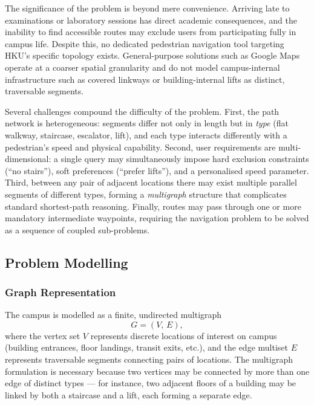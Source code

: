 \documentclass[a4paper,10pt]{amsart}
\begin{document}
The significance of the problem is beyond mere convenience.
Arriving late to examinations or laboratory sessions has direct academic consequences, and the inability to find accessible routes may exclude users from participating fully in campus life.
Despite this, no dedicated pedestrian navigation tool targeting HKU's specific topology exists.
General-purpose solutions such as Google Maps operate at a coarser spatial granularity and do not model campus-internal infrastructure such as covered linkways or building-internal lifts as distinct, traversable segments.

Several challenges compound the difficulty of the problem.
First, the path network is heterogeneous: segments differ not only in length but in \emph{type} (flat walkway, staircase, escalator, lift), and each type interacts differently with a pedestrian's speed and physical capability.
Second, user requirements are multi-dimensional: a single query may simultaneously impose hard exclusion constraints (``no stairs''), soft preferences (``prefer lifts''), and a personalised speed parameter.
Third, between any pair of adjacent locations there may exist multiple parallel segments of different types, forming a \emph{multigraph} structure that complicates standard shortest-path reasoning.
Finally, routes may pass through one or more mandatory intermediate waypoints, requiring the navigation problem to be solved as a sequence of coupled sub-problems.

\subsection{Problem Modelling} \label{sec:problem-modeling}

\subsubsection{Graph Representation}

The campus is modelled as a finite, undirected multigraph
\begin{equation} \label{eq:graph}
    G = (V,\, E),
\end{equation}
where the vertex set $V$ represents discrete locations of interest on campus (building entrances, floor landings, transit exits, etc.), and the edge multiset $E$ represents traversable segments connecting pairs of locations.
The multigraph formulation is necessary because two vertices may be connected by more than one edge of distinct types --- for instance, two adjacent floors of a building may be linked by both a staircase and a lift, each forming a separate edge.
\end{document}
